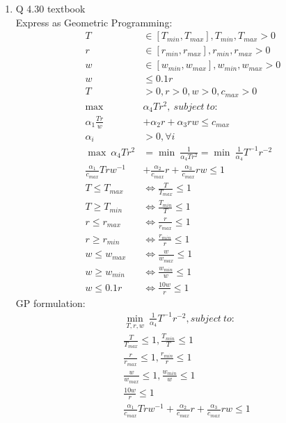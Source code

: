 \documentclass[12pt,letter]{article}
\begin{document}
\begin{enumerate}
\item Q 4.30 textbook\\
  Express as Geometric Programming:
  \begin{align*}
    T & \in [T_{min}, T_{max}], T_{min},T_{max} > 0 \\
    r & \in [r_{min}, r_{max}], r_{min},r_{max} > 0\\
    w & \in [w_{min}, w_{max}], w_{min},w_{max} > 0\\
    w & \leq 0.1 r\\
    T &> 0, r > 0, w > 0, c_{max} > 0\\
    \max\ &\alpha_4 T r^2,\ subject\ to:\\
    \alpha_1 \frac{T r}{w} & + \alpha_2 r + \alpha_3 r w \leq c_{max}\\
    \alpha_i &> 0, \forall i\\
    \max\ \alpha_4 T r^2&=\min\ \frac{1}{\alpha_4 T r^2} = \min\ \frac{1}{\alpha_4} T^{-1} r^{-2}\\
    \frac{\alpha_1}{c_{max}} T rw^{-1} & + \frac{\alpha_2}{c_{max}} r + \frac{\alpha_3}{c_{max}} r w \leq 1\\
    T \leq T_{max} &\iff \frac{T}{T_{max}} \leq 1\\
    T \geq T_{min} &\iff \frac{T_{min}}{T} \leq 1\\
    r \leq r_{max} &\iff \frac{r}{r_{max}} \leq 1\\
    r \geq r_{min} &\iff \frac{r_{min}}{r} \leq 1\\
    w \leq w_{max} &\iff \frac{w}{w_{max}} \leq 1\\
    w \geq w_{min} &\iff \frac{w_{min}}{w} \leq 1\\
    w \leq 0.1 r &\iff \frac{10w}{r} \leq 1
  \end{align*}
  GP formulation:
  \begin{align*}
    &\min_{T,r,w}\ \frac{1}{\alpha_4} T^{-1} r^{-2}, subject\ to:\\
    &\frac{T}{T_{max}} \leq 1, \frac{T_{min}}{T} \leq 1\\
    &\frac{r}{r_{max}} \leq 1, \frac{r_{min}}{r} \leq 1\\
    &\frac{w}{w_{max}} \leq 1, \frac{w_{min}}{w} \leq 1\\
    &\frac{10w}{r} \leq 1 \\
    &\frac{\alpha_1}{c_{max}} T rw^{-1} + \frac{\alpha_2}{c_{max}} r + \frac{\alpha_3}{c_{max}} r w \leq 1\\

\end{align*}
\end{enumerate}
\end{document}

